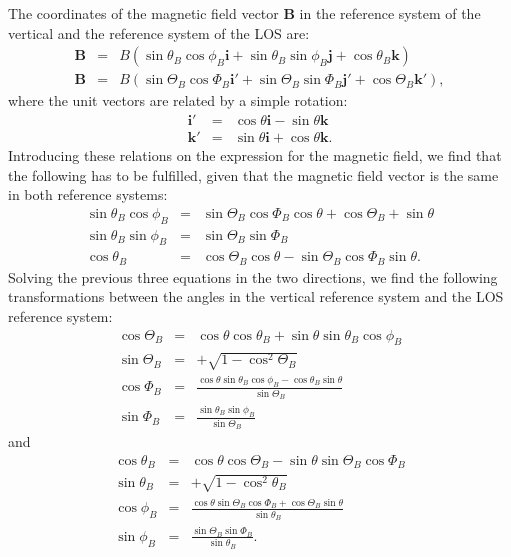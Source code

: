 \documentclass[12pt]{article}
\begin{document}
The coordinates of the magnetic field vector $\mathbf{B}$ in the reference system of the vertical
and the reference system of the LOS are:
\begin{eqnarray}
\mathbf{B} &=& B \left(\sin \theta_B \cos \phi_B \mathbf{i}+\sin \theta_B \sin \phi_B \mathbf{j}+\cos \theta_B \mathbf{k} \right) \nonumber \\
\mathbf{B} &=& B \left(\sin \Theta_B \cos \Phi_B \mathbf{i}'+\sin \Theta_B \sin \Phi_B \mathbf{j}'+\cos \Theta_B \mathbf{k}' \right),
\end{eqnarray}
where the unit vectors are related by a simple rotation:
\begin{eqnarray}
\mathbf{i}' &=& \cos \theta \mathbf{i} - \sin \theta \mathbf{k} \nonumber \\
\mathbf{k}' &=& \sin \theta \mathbf{i} + \cos \theta \mathbf{k}.
\end{eqnarray}
Introducing these relations on the expression for the magnetic field, we find that the
following has to be fulfilled, given that the magnetic field vector is the same in both reference systems:
\begin{eqnarray}
\sin \theta_B \cos \phi_B &=& \sin \Theta_B \cos \Phi_B \cos \theta + \cos \Theta_B + \sin \theta \nonumber \\
\sin \theta_B \sin \phi_B &=& \sin \Theta_B \sin \Phi_B \nonumber \\
\cos \theta_B &=& \cos \Theta_B \cos \theta - \sin \Theta_B \cos \Phi_B \sin \theta.
\end{eqnarray}
Solving the previous three equations in the two directions, we find the following transformations
between the angles in the vertical reference system and the LOS reference system:
\begin{eqnarray}
\cos \Theta_B &=& \cos\theta \cos\theta_B + \sin\theta \sin\theta_B \cos\phi_B \nonumber \\
\sin \Theta_B &=& +\sqrt{1-\cos^2\Theta_B} \nonumber \\
\cos \Phi_B &=& \frac{\cos\theta \sin\theta_B \cos\phi_B - \cos\theta_B \sin\theta}{\sin \Theta_B} \nonumber \\
\sin \Phi_B &=& \frac{\sin\theta_B \sin\phi_B}{\sin\Theta_B}
\end{eqnarray}
and
\begin{eqnarray}
\cos \theta_B &=& \cos\theta \cos\Theta_B - \sin\theta \sin\Theta_B \cos\Phi_B \nonumber \\
\sin \theta_B &=& +\sqrt{1-\cos^2\theta_B} \nonumber \\
\cos \phi_B &=& \frac{\cos\theta \sin\Theta_B \cos\Phi_B + \cos\Theta_B \sin\theta}{\sin \theta_B} \nonumber \\
\sin \phi_B &=& \frac{\sin\Theta_B \sin\Phi_B}{\sin\theta_B}.
\end{eqnarray}
\end{document}
